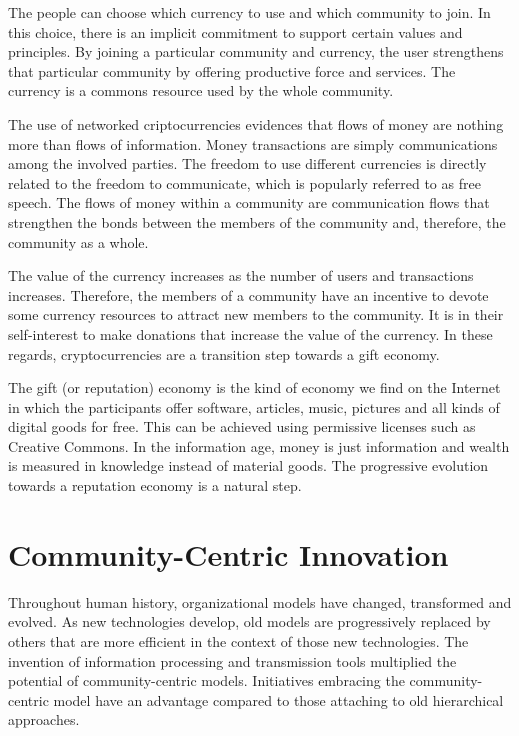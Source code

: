 \documentclass[journal]{IEEEtran}
\begin{document}
The people can choose which currency to use and which community to join.
In this choice, there is an implicit commitment to support certain values and principles.
By joining a particular community and currency, the user strengthens that particular community by offering productive force and services.
The currency is a commons resource used by the whole community.

The use of networked criptocurrencies evidences that flows of money are nothing more than flows of information.
Money transactions are simply communications among the involved parties.
The freedom to use different currencies is directly related to the freedom to communicate, which is popularly referred to as free speech.
The flows of money within a community are communication flows that strengthen the bonds between the members of the community and, therefore, the community as a whole.

The value of the currency increases as the number of users and transactions increases.
Therefore, the members of a community have an incentive to devote some currency resources to attract new members to the community.
It is in their self-interest to make donations that increase the value of the currency.
In these regards, cryptocurrencies are a transition step towards a gift economy.

The gift (or reputation) economy is the kind of economy we find on the Internet in which the participants offer software, articles, music, pictures and all kinds of digital goods for free.
This can be achieved using permissive licenses such as Creative Commons.
In the information age, money is just information and wealth is measured in knowledge instead of material goods.
The progressive evolution towards a reputation economy is a natural step.

\section{Community-Centric Innovation}
\label{sec:other}

Throughout human history, organizational models have changed, transformed and evolved.
As new technologies develop, old models are progressively replaced by others that are more efficient in the context of those new technologies.
The invention of information processing and transmission tools multiplied the potential of community-centric models.
Initiatives embracing the community-centric model have an advantage compared to those attaching to old hierarchical approaches.
\end{document}
